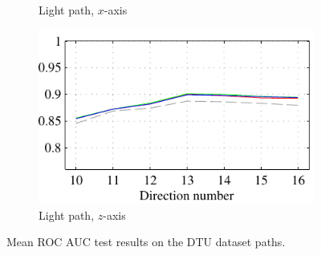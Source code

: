 \documentclass[thesis.tex]{subfiles}
\begin{document}
\begin{figure}[tb]
{\begin{subfigure}[t]{0.6242\textwidth}
		\caption{Light path, $x$-axis}
		\label{fig:dtuResultsROCyAxis}
	\end{subfigure}
	\begin{subfigure}[t]{0.5618\textwidth}
		\includegraphics[width=\textwidth]{img/dtuResultsROC_opponent_6.pdf}
		\caption{Light path, $z$-axis}
		\label{fig:dtuResultsROCzAxis}
	\end{subfigure}
	}
	\caption{Mean ROC AUC test results on the DTU dataset paths.}
	\label{fig:dtuResultsROC}
\end{figure}
%
\end{document}
